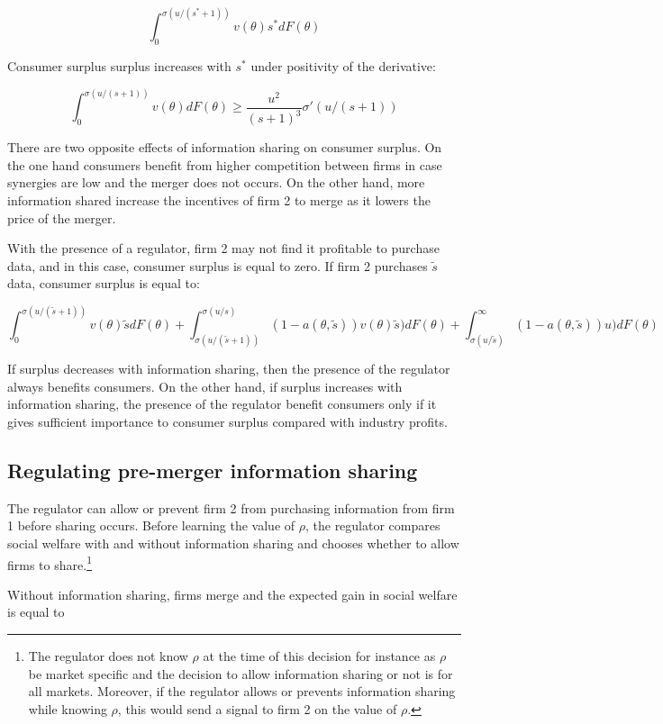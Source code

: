 \documentclass[a4paper,leqno]{article}%
\renewcommand{\t}{\theta}
\newcommand{\s}{\sigma}
\begin{document}
\[
\int_{0}^{\s(u/(s^*+1))}v(\t)s^* dF(\t)
\]

Consumer surplus surplus increases with $s^*$ under positivity of the derivative:

\[
\int_{0}^{\s(u/(s+1))}v(\t) dF(\t)\geq \frac{u^2}{(s+1)^3}\s'(u/(s+1))
\]

There are two opposite effects of information sharing on consumer surplus. On the one hand consumers benefit from higher competition between firms in case synergies are low and the merger does not occurs. On the other hand, more information shared increase the incentives of firm 2 to merge as it lowers the price of the merger.

\medskip

With the presence of a regulator, firm 2 may not find it profitable to purchase data, and in this case, consumer surplus is equal to zero. If firm 2 purchases $\tilde s$ data, consumer surplus is equal to:

\[
\int_{0}^{\s(u/(\tilde s+1))}v(\t)\tilde s dF(\t)+\int_{\s(u/(\tilde s+1))}^{\s(u/s)}(1-a(\t,\tilde s))v(\t)\tilde s)dF(\t)+\int_{\s(u/\tilde s)}^\infty (1-a(\t,\tilde s))u)dF(\t)
\]

If surplus decreases with information sharing, then the presence of the regulator always benefits consumers. On the other hand, if surplus increases with information sharing, the presence of the regulator benefit consumers only if it gives sufficient importance to consumer surplus compared with industry profits. 


\medskip

\subsection{Regulating pre-merger information sharing}

The regulator can allow or prevent firm 2 from purchasing information from firm 1 before sharing occurs. Before learning the value of $\rho$, the regulator compares social welfare with and without information sharing and chooses whether to allow firms to share.\footnote{The regulator does not know $\rho$ at the time of this decision for instance as $\rho$ be market specific and the decision to allow information sharing or not is for all markets. Moreover, if the regulator allows or prevents information sharing while knowing $\rho$, this would send a signal to firm 2 on the value of $\rho$.}

Without information sharing, firms merge and the expected gain in social welfare is equal to 
\end{document}
